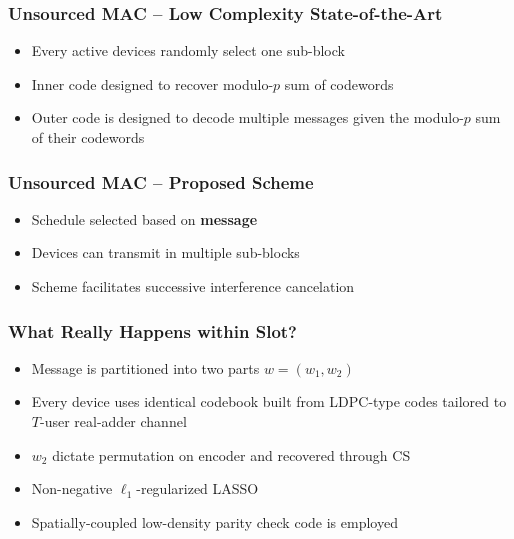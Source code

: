 \documentclass[10pt]{beamer}
\begin{document}
\begin{frame}
\frametitle{Unsourced MAC -- Low Complexity State-of-the-Art}
\begin{center}
\scalebox{0.75}{}
\end{center}
\begin{itemize}
\item Every active devices randomly select one sub-block
\item Inner code designed to recover modulo-$p$ sum of codewords
\item Outer code is designed to decode multiple messages given the modulo-$p$ sum of their codewords
\end{itemize}
\end{frame}


\begin{frame}
\frametitle{Unsourced MAC -- Proposed Scheme}
\begin{center}
\scalebox{0.75}{}
\end{center}
\begin{itemize}
\item Schedule selected based on \textbf{message}
\item Devices can transmit in multiple sub-blocks
\item Scheme facilitates successive interference cancelation
\end{itemize}
\end{frame}


\begin{frame}
\frametitle{What Really Happens within Slot?}
\begin{center}
\scalebox{1}{}
\end{center}
\begin{itemize}
\item Message is partitioned into two parts $w = (w_1, w_2)$
\item Every device uses identical codebook built from LDPC-type codes tailored to $T$-user real-adder channel
\item $w_2$ dictate permutation on encoder and recovered through CS
\item Non-negative $\ell_1$-regularized LASSO
\item Spatially-coupled low-density parity check code is employed
\end{itemize}
\end{frame}
\end{document}

